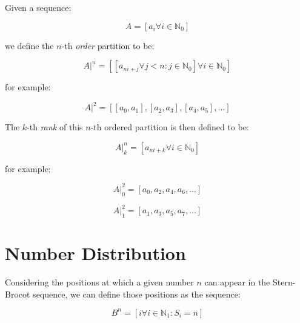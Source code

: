 \documentclass{article}
\begin{document}
\noindent
Given a sequence:

\begin{displaymath}
A = [a_i \forall i \in \mathbb{N}_{0}]
\end{displaymath}

\noindent
we define the \begin{math}n\end{math}-th \emph{order} partition to be:

\begin{displaymath}
A|^n
=
\left[
[a_{ni+j} \forall j < n : j \in \mathbb{N}_0]
\forall i \in \mathbb{N}_0
\right]
\end{displaymath}

\noindent
for example:

\begin{displaymath}
A|^2
=
[[a_0, a_1], [a_2, a_3], [a_4, a_5], ...]
\end{displaymath}

\noindent
The \begin{math}k\end{math}-th \emph{rank} of this \begin{math}n\end{math}-th
ordered partition is then defined to be:

\begin{displaymath}
A|^n_k
=
\left[
a_{ni+k}
\forall i \in \mathbb{N}_0
\right]
\end{displaymath}

\noindent
for example:

\begin{displaymath}
A|^2_0 = [a_0, a_2, a_4, a_6, ...]
\end{displaymath}

\begin{displaymath}
A|^2_1 = [a_1, a_3, a_5, a_7, ...]
\end{displaymath}

\section{Number Distribution}

Considering the positions at which a given number \begin{math}n\end{math} can
appear in the Stern-Brocot sequence, we can define those positions as the
sequence:

\begin{displaymath}
B^n = [i \forall i \in \mathbb{N}_{1} : S_i = n]
\end{displaymath}
\end{document}
